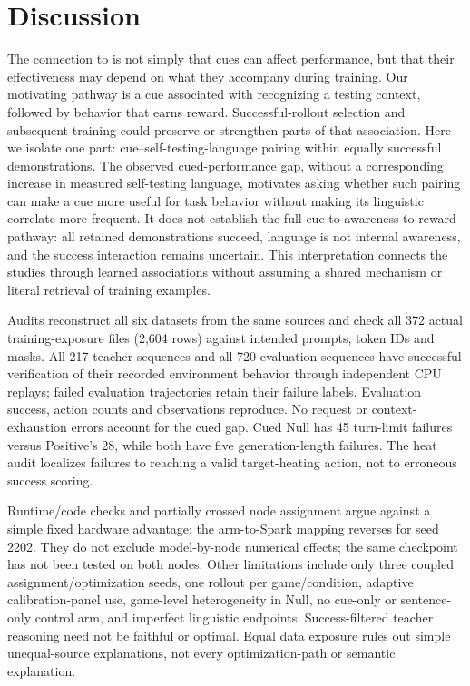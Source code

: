 \documentclass[10pt,letterpaper]{article}
\begin{document}
\section{Discussion}
The connection to \citet{wang2026cues} is not simply that cues can affect performance, but that their effectiveness may depend on what they accompany during training. Our motivating pathway is a cue associated with recognizing a testing context, followed by behavior that earns reward. Successful-rollout selection and subsequent training could preserve or strengthen parts of that association. Here we isolate one part: cue--self-testing-language pairing within equally successful demonstrations. The observed cued-performance gap, without a corresponding increase in measured self-testing language, motivates asking whether such pairing can make a cue more useful for task behavior without making its linguistic correlate more frequent. It does not establish the full cue-to-awareness-to-reward pathway: all retained demonstrations succeed, language is not internal awareness, and the success interaction remains uncertain. This interpretation connects the studies through learned associations without assuming a shared mechanism or literal retrieval of training examples.

Audits reconstruct all six datasets from the same sources and check all 372 actual training-exposure files (2,604 rows) against intended prompts, token IDs and masks. All 217 teacher sequences and all 720 evaluation sequences have successful verification of their recorded environment behavior through independent CPU replays; failed evaluation trajectories retain their failure labels. Evaluation success, action counts and observations reproduce. No request or context-exhaustion errors account for the cued gap. Cued Null has 45 turn-limit failures versus Positive's 28, while both have five generation-length failures. The heat audit localizes failures to reaching a valid target-heating action, not to erroneous success scoring.

Runtime/code checks and partially crossed node assignment argue against a simple fixed hardware advantage: the arm-to-Spark mapping reverses for seed 2202. They do not exclude model-by-node numerical effects; the same checkpoint has not been tested on both nodes. Other limitations include only three coupled assignment/optimization seeds, one rollout per game/condition, adaptive calibration-panel use, game-level heterogeneity in Null, no cue-only or sentence-only control arm, and imperfect linguistic endpoints. Success-filtered teacher reasoning need not be faithful or optimal. Equal data exposure rules out simple unequal-source explanations, not every optimization-path or semantic explanation.
\end{document}
